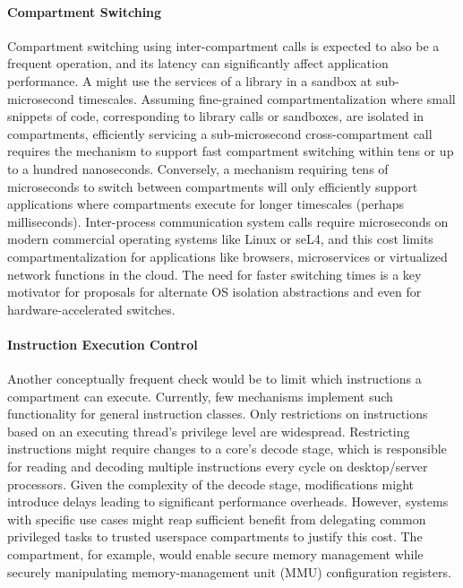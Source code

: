 \paragraph{Compartment Switching}
Compartment switching using inter-compartment calls is expected to also be
a frequent operation, and its latency can significantly affect application
performance.
A \sandbox might use the services of a library in a \nested sandbox
at sub-microsecond timescales.
Assuming fine-grained compartmentalization where small snippets of code, 
corresponding to library calls or sandboxes,
are isolated in compartments, efficiently servicing a sub-microsecond 
cross-compartment call requires the mechanism to support fast compartment
switching within tens or up to a hundred nanoseconds.
Conversely, a mechanism requiring tens of microseconds to switch between
compartments will only efficiently support applications where compartments 
execute for longer timescales (perhaps milliseconds).
Inter-process communication system calls require microseconds on modern
commercial operating systems like Linux or seL4, and this cost limits
compartmentalization for applications like browsers, microservices or 
virtualized network functions in the cloud.
The need for faster switching times is a key motivator for proposals for
alternate OS isolation abstractions and even for hardware-accelerated 
switches.

\paragraph{Instruction Execution Control}
Another conceptually frequent check would be to limit which instructions
a compartment can execute.
Currently, few mechanisms implement such functionality for general instruction
classes.
Only restrictions on instructions based on an executing thread's 
privilege level are widespread.
Restricting instructions might require changes to a core's decode stage, which is
responsible for reading and decoding multiple instructions every cycle on
desktop/server processors.
Given the complexity of the decode stage, modifications might introduce delays 
leading to significant performance overheads.
However, systems with specific use cases might reap sufficient benefit from
delegating common privileged tasks to trusted userspace compartments to justify
this cost.
The \manager compartment, for example, would enable secure memory management
while securely manipulating memory-management unit (MMU) configuration registers.

